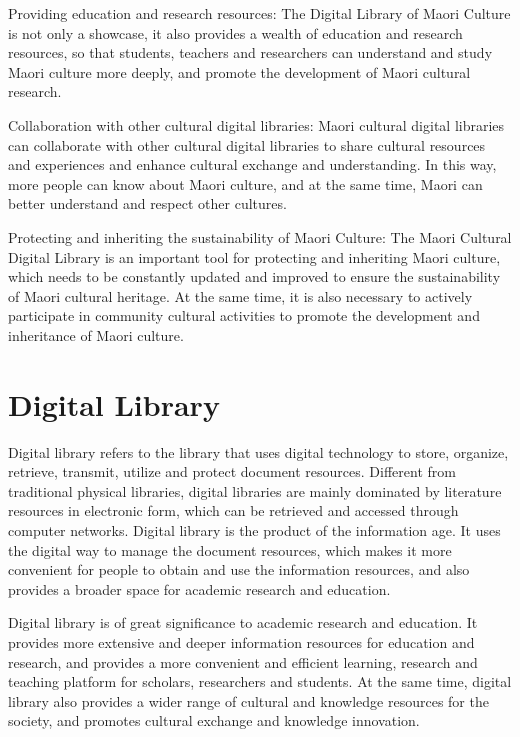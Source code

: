 Providing education and research resources: The Digital Library of Maori Culture is not only a showcase, it also provides a wealth of education and research resources, so that students, teachers and researchers can understand and study Maori culture more deeply, and promote the development of Maori cultural research.

Collaboration with other cultural digital libraries: Maori cultural digital libraries can collaborate with other cultural digital libraries to share cultural resources and experiences and enhance cultural exchange and understanding. In this way, more people can know about Maori culture, and at the same time, Maori can better understand and respect other cultures.

Protecting and inheriting the sustainability of Maori Culture: The Maori Cultural Digital Library is an important tool for protecting and inheriting Maori culture, which needs to be constantly updated and improved to ensure the sustainability of Maori cultural heritage. At the same time, it is also necessary to actively participate in community cultural activities to promote the development and inheritance of Maori culture.
 
\section{Digital Library}
Digital library refers to the library that uses digital technology to store, organize, retrieve, transmit, utilize and protect document resources. Different from traditional physical libraries, digital libraries are mainly dominated by literature resources in electronic form, which can be retrieved and accessed through computer networks. Digital library is the product of the information age. It uses the digital way to manage the document resources, which makes it more convenient for people to obtain and use the information resources, and also provides a broader space for academic research and education.

Digital library is of great significance to academic research and education. It provides more extensive and deeper information resources for education and research, and provides a more convenient and efficient learning, research and teaching platform for scholars, researchers and students. At the same time, digital library also provides a wider range of cultural and knowledge resources for the society, and promotes cultural exchange and knowledge innovation.

